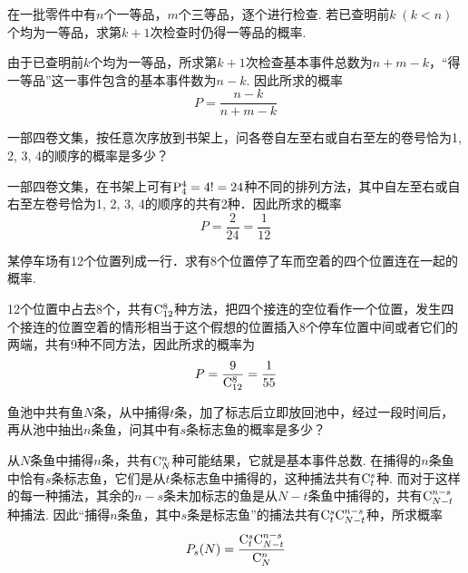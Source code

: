 \begin{example}
    在一批零件中有$n$个一等品，$m$个三等品，逐个进行检查. 若已查明前$k\;(k<n)$个均为一等品，求第$k+1$次检查时仍得一等品的概率.
\end{example}

\begin{solution}
    由于已查明前$k$个均为一等品，所求第$k+1$次检查基本事件总数为$n+m-k$，“得一等品”这一事件包含的基本事件数为$n-k$. 因此所求的概率
    \[P=\frac{n-k}{n+m-k}\]
\end{solution}


\begin{example}
    一部四卷文集，按任意次序放到书架上，问各卷自左至右或自右至左的卷号恰为1, 2, 3, 4的顺序的概率是多少？
\end{example}

\begin{solution}
    一部四卷文集，在书架上可有${\rm P}^{4}_{4}=4!=24$种不同的排列方法，其中自左至右或自右至左卷号恰为1, 2, 3, 4的顺序的共有2种．因此所求的概率
    \[P=\frac{2}{24}=\frac{1}{12}\]
\end{solution}

\begin{example}
    某停车场有12个位置列成一行．求有8个位置停了车而空着的四个位置连在一起的概率.
\end{example}

\begin{solution}
12个位置中占去8个，共有${\rm C}^{8}_{12}$种方法，把四个接连的空位看作一个位置，发生四个接连的位置空着的情形相当于这个假想的位置插入8个停车位置中间或者它们的两端，共有9种不同方法，因此所求的概率为
\[P=\dfrac{9}{{\rm C}^{8}_{12}}=\dfrac{1}{55}\]
\end{solution}

\begin{example}
    鱼池中共有鱼$N$条，从中捕得$t$条，加了标志后立即放回池中，经过一段时间后，再从池中抽出$n$条鱼，问其中有$s$条标志鱼的概率是多少？
\end{example}

\begin{solution}
    从$N$条鱼中捕得$n$条，共有${\rm C}^{n}_{N}$种可能结果，它就是基本事件总数. 在捕得的$n$条鱼中恰有$s$条标志鱼，它们是从$t$条标志鱼中捕得的，这种捕法共有${\rm C}^{s}_{t}$种. 而对于这样的每一种捕法，其余的$n-s$条未加标志的鱼是从$N-t$条鱼中捕得的，共有${\rm C}^{n-s}_{N-t}$种捕法. 因此“捕得$n$条鱼，其中$s$条是标志鱼”的捕法共有${\rm C}^{s}_{t}{\rm C}^{n-s}_{N-t}$种，所求概率
\[P_s(N)=\dfrac{{\rm C}^{s}_{t}{\rm C}^{n-s}_{N-t}}{{\rm C}^{n}_{N}}\]
\end{solution}

